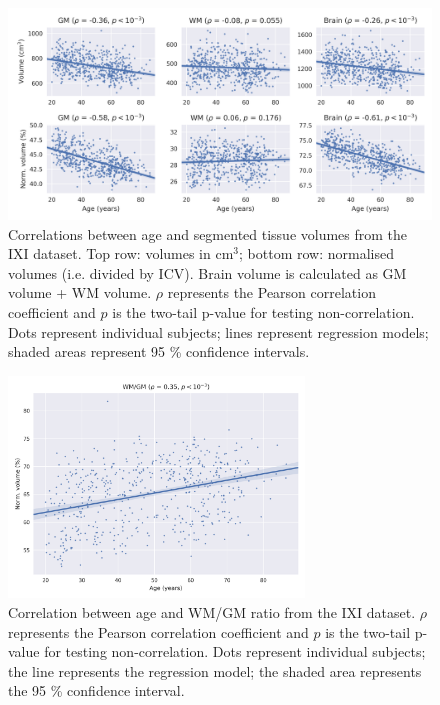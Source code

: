 \begin{figure}
  \centering
  \includegraphics[width=\textwidth]{figures/volumes_stats_pearson_ixi}
  \caption{Correlations between age and segmented tissue volumes from the IXI dataset. Top row: volumes in cm$^3$; bottom row: normalised volumes (i.e. divided by ICV). Brain volume is calculated as GM volume + WM volume. $\rho$ represents the Pearson correlation coefficient and $p$ is the two-tail p-value for testing non-correlation. Dots represent individual subjects; lines represent regression models; shaded areas represent 95 \% confidence intervals.}
  \label{fig:ixi-all}
\end{figure}

\begin{figure}
  \centering
  \includegraphics[width=0.7\textwidth]{figures/volumes_stats_pearson_wm_gm_ixi}
  \caption{Correlation between age and WM/GM ratio from the IXI dataset. $\rho$ represents the Pearson correlation coefficient and $p$ is the two-tail p-value for testing non-correlation. Dots represent individual subjects; the line represents the regression model; the shaded area represents the 95 \% confidence interval.}
  \label{fig:ixi-ratio}
\end{figure}
